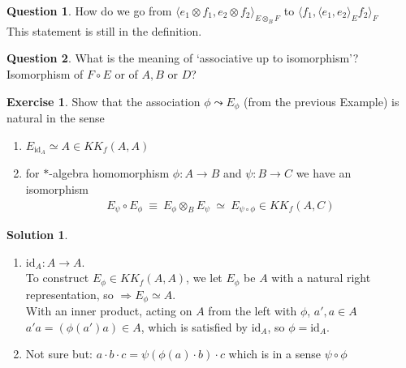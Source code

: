 \documentclass[a4paper]{article}
\theoremstyle{definition}
\theoremstyle{definition}
\newtheorem{question}{Question}
\theoremstyle{definition}
\theoremstyle{theorem}
\theoremstyle{theorem}
\newtheorem{exercise}{Exercise}
\theoremstyle{theorem}
\theoremstyle{definition}
\newtheorem{solution}{Solution}
\begin{document}
\begin{question}
 How do we go from $\langle e_1 \otimes f_1, e_2 \otimes f_2\rangle _{E\otimes _B F}$ to $
    \langle f_1,\langle e_1, e_2\rangle _E f_2\rangle _F$ \label{q: tensorproduct}\\
    This statement is still in the definition.
\end{question}

\begin{question}
What is the meaning of `associative up to isomorphism'? Isomorphism of $F \circ E$ or of $A, B$ or $D$?
\end{question}

\begin{exercise}
    Show that the association $\phi \leadsto E_\phi$ (from the previous Example) is natural
    in the sense
    \begin{enumerate}
        \item $E_{\text{id}_A} \simeq A \in KK_f(A,A)$
        \item for $*$-algebra homomorphism $\phi: A \rightarrow B$ and $\psi: B \rightarrow C$ we have
            an isomorphism
            \begin{align*}
                E_{\psi} \circ E_{\phi}\ \equiv\ E_{\phi} \otimes _B E_{\psi}\ \simeq\
                E_{\psi \circ \phi} \in KK_f(A,C)
            \end{align*}
    \end{enumerate}
\end{exercise}

\begin{solution}
    \begin{enumerate}
        \
        \item $\text{id}_A: A \rightarrow A$.\\
            To construct $E_{\phi}\in KK_f(A,A)$, we let $E_{\phi}$ be $A$ with a natural right
            representation, so $\Rightarrow E_{\phi}\simeq A$.\\
            With an inner product, acting on $A$ from the left with $\phi$, $a', a\in A$\\
            $a'a = (\phi(a') a) \in A $, which is satisfied by $\text{id}_A$, so $\phi = \text{id}_A$.
        \item Not sure but: $a \cdot b \cdot c = \psi(\phi(a) \cdot b) \cdot c$ which is in a sense
            $\psi \circ \phi$
    \end{enumerate}
\end{solution}
\end{document}
